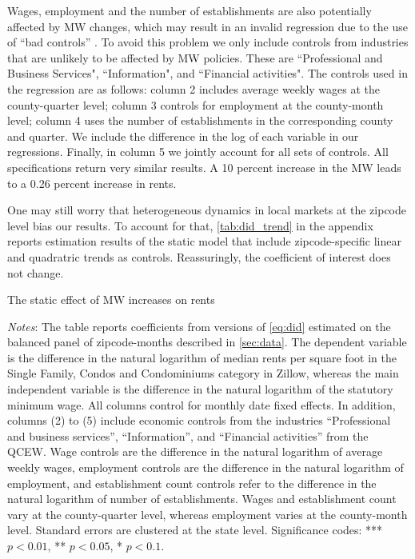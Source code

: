 Wages, employment and the number of establishments are also potentially affected by MW changes,
which may result in an invalid regression due to the use of ``bad controls'' 
\parencite{AngristPischke2009}. To avoid this problem we only include controls from industries 
that are unlikely to be affected by MW policies. These are ``Professional and Business Services", 
``Information", and ``Financial activities". The controls used in the regression are as follows:
column 2 includes average weekly wages at the county-quarter level; column 3 controls for 
employment at the county-month level; column 4 uses the number of establishments in the 
corresponding county and quarter. We include the difference in the log of each variable in our
regressions. Finally, in column 5 we jointly account for all sets of controls. All specifications 
return very similar results. A 10 percent increase in the MW leads to a 0.26 percent increase 
in rents. 

One may still worry that heterogeneous dynamics in local markets at the zipcode level bias our 
results. To account for that, \autoref{tab:did_trend} in the appendix reports estimation 
results of the static model that include zipcode-specific linear and quadratric trends as controls. 
Reassuringly, the coefficient of interest does not change.

\begin{table}[h!]
    \caption{The static effect of MW increases on rents}
    \label{tab:static_model}
    \centering
    
    \begin{minipage}{0.9\textwidth} \footnotesize
		\vspace{3mm} 
		\textit{Notes}: The table reports coefficients from versions of \autoref{eq:did} 
		estimated on the balanced panel of zipcode-months described in \autoref{sec:data}. 
		The dependent variable is the difference in the natural logarithm of median	rents 
		per square foot in the Single Family, Condos and Condominiums category in Zillow, 
		whereas the main independent variable is the difference in the natural logarithm of 
		the statutory minimum wage. All columns control for monthly date fixed effects. In 
		addition, columns (2) to (5) include economic controls from the industries 
		``Professional and business services'', ``Information'', and ``Financial activities'' 
		from the QCEW. Wage controls are the difference in the natural logarithm of average 
		weekly wages, employment controls are the difference in the natural logarithm of 
		employment, and establishment count controls refer to the difference in the natural 
		logarithm of number of establishments. Wages and establishment count vary at the 
		county-quarter level, whereas employment varies at the county-month level. Standard 
		errors are clustered at the state level. Significance codes: *** $p < 0.01$, ** 
		$p < 0.05$, * $p < 0.1$.
	\end{minipage}
\end{table}

